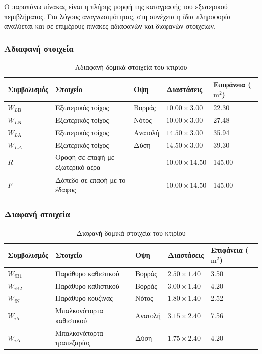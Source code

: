 \documentclass[12pt,a4paper]{article}
\begin{document}
\noindent Ο παραπάνω πίνακας είναι η πλήρης μορφή της καταγραφής του εξωτερικού
περιβλήματος. Για λόγους αναγνωσιμότητας, στη συνέχεια η ίδια πληροφορία αναλύεται
και σε επιμέρους πίνακες αδιαφανών και διαφανών στοιχείων.

\subsubsection{Αδιαφανή στοιχεία}

\begin{table}[H]
\centering
\small
\caption{Αδιαφανή δομικά στοιχεία του κτιρίου}
\begin{tabularx}{\textwidth}{C{2.6cm} L C{2.2cm} C{3.0cm} C{2.4cm}}
\toprule
\textbf{Συμβολισμός} & \textbf{Στοιχείο} & \textbf{Όψη} & \textbf{Διαστάσεις} & \textbf{Επιφάνεια (\(\mathrm{m^2}\))} \\
\midrule
\(W_{L\mathrm{B}}\) & Εξωτερικός τοίχος & Βορράς & \(10.00 \times 3.00\) & 22.30 \\
\(W_{L\mathrm{N}}\) & Εξωτερικός τοίχος & Νότος & \(10.00 \times 3.00\) & 27.48 \\
\(W_{L\mathrm{A}}\) & Εξωτερικός τοίχος & Ανατολή & \(14.50 \times 3.00\) & 35.94 \\
\(W_{L\Delta}\) & Εξωτερικός τοίχος & Δύση & \(14.50 \times 3.00\) & 39.30 \\
\(R\) & Οροφή σε επαφή με εξωτερικό αέρα & -- & \(10.00 \times 14.50\) & 145.00 \\
\(F\) & Δάπεδο σε επαφή με το έδαφος & -- & \(10.00 \times 14.50\) & 145.00 \\
\bottomrule
\end{tabularx}
\end{table}

\subsubsection{Διαφανή στοιχεία}

\begin{table}[H]
\centering
\small
\caption{Διαφανή δομικά στοιχεία του κτιρίου}
\begin{tabularx}{\textwidth}{C{2.6cm} L C{2.3cm} C{3.0cm} C{2.4cm}}
\toprule
\textbf{Συμβολισμός} & \textbf{Στοιχείο} & \textbf{Όψη} & \textbf{Διαστάσεις} & \textbf{Επιφάνεια (\(\mathrm{m^2}\))} \\
\midrule
\(W_{i\mathrm{B}1}\) & Παράθυρο καθιστικού & Βορράς & \(2.50 \times 1.40\) & 3.50 \\
\(W_{i\mathrm{B}2}\) & Παράθυρο καθιστικού & Βορράς & \(3.00 \times 1.40\) & 4.20 \\
\(W_{i\mathrm{N}}\) & Παράθυρο κουζίνας & Νότος & \(1.80 \times 1.40\) & 2.52 \\
\(W_{i\mathrm{A}}\) & Μπαλκονόπορτα καθιστικού & Ανατολή & \(3.15 \times 2.40\) & 7.56 \\
\(W_{i\Delta}\) & Μπαλκονόπορτα τραπεζαρίας & Δύση & \(1.75 \times 2.40\) & 4.20 \\
\bottomrule
\end{tabularx}
\end{table}
\end{document}
